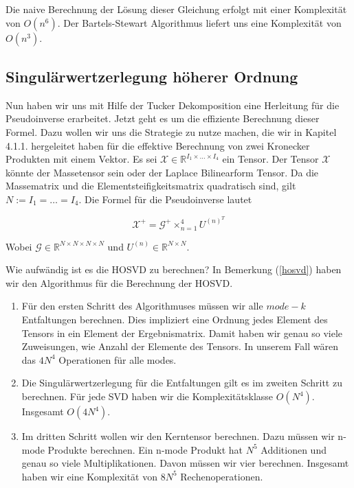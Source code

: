 Die naive Berechnung der Lösung dieser Gleichung erfolgt mit einer Komplexität von $O(n^6)$. Der Bartels-Stewart Algorithmus \cite{Bartels} liefert uns eine Komplexität von $O(n^3)$. 

\subsection{Singulärwertzerlegung höherer Ordnung}
Nun haben wir uns mit Hilfe der Tucker Dekomposition eine Herleitung für die Pseudoinverse erarbeitet. Jetzt geht es um die effiziente Berechnung dieser Formel. Dazu wollen wir uns die Strategie zu nutze machen, die wir in Kapitel 4.1.1. hergeleitet haben für die effektive Berechnung von zwei Kronecker Produkten mit einem Vektor.
Es sei $\mathscr{X} \in \mathbb{R}^{I_1 \times \dots \times I_{4}}$ ein Tensor. Der Tensor $\mathscr{X}$ könnte der Massetensor sein oder der Laplace Bilinearform Tensor. Da die Massematrix und die Elementsteifigkeitsmatrix quadratisch sind, gilt $N:= I_1 = \dots = I_4$.
Die Formel für die Pseudoinverse lautet

\begin{equation} \label{eq:pinv}
\mathscr{X}^{+} = \mathscr{G}^{+} \times_{n=1}^{4} U^{ (n) ^{T} }
\end{equation}

Wobei $\mathscr{G} \in \mathbb{R}^{N \times N \times N \times N}$ und $U^{(n)} \in \mathbb{R}^{N \times N}$.

Wie aufwändig ist es die HOSVD zu berechnen?
In Bemerkung (\ref{hosvd}) haben wir den Algorithmus für die Berechnung der HOSVD. 
\begin{enumerate}
\item Für den ersten Schritt des Algorithmuses müssen wir alle $mode-k$ Entfaltungen berechnen. Dies impliziert eine Ordnung jedes Element des Tensors in ein Element der Ergebnismatrix. Damit haben wir genau so viele Zuweisungen, wie Anzahl der Elemente des Tensors. In unserem Fall wären das $4N^4$ Operationen für alle modes. 

\item Die Singulärwertzerlegung für die Entfaltungen gilt es im zweiten Schritt zu berechnen. Für jede SVD haben wir die Komplexitätsklasse $O(N^4)$. Insgesamt $O(4N^4)$.

\item Im dritten Schritt wollen wir den Kerntensor berechnen. Dazu müssen wir n-mode Produkte berechnen. Ein n-mode Produkt hat  $N^5$ Additionen und genau so viele Multiplikationen. Davon müssen wir vier berechnen. Insgesamt haben wir eine Komplexität von $8N^5$ Rechenoperationen.

\end{enumerate}

